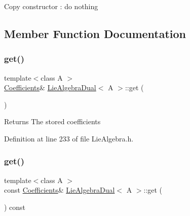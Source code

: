Copy constructor \+: do nothing 

\subsection{Member Function Documentation}
\hypertarget{class_lie_algebra_dual_a9e03668378642cf1147226aa6925a76d}{}\label{class_lie_algebra_dual_a9e03668378642cf1147226aa6925a76d} 
\subsubsection{\texorpdfstring{get()}{get()}\hspace{0.1cm}{\footnotesize\ttfamily [1/2]}}
{\footnotesize\ttfamily template$<$class A $>$ \\
\hyperlink{class_lie_algebra_dual_a82710c51eb4d0b6cbd190e76a33fbc17}{Coefficients}\& \hyperlink{class_lie_algebra_dual}{Lie\+Algebra\+Dual}$<$ A $>$\+::get (\begin{DoxyParamCaption}{ }\end{DoxyParamCaption})\hspace{0.3cm}{\ttfamily [inline]}}

\begin{DoxyReturn}{Returns}
The stored coefficients 
\end{DoxyReturn}


Definition at line 233 of file Lie\+Algebra.\+h.

\hypertarget{class_lie_algebra_dual_aa0fb0278ce57f0ec91b71b849d8e1f3c}{}\label{class_lie_algebra_dual_aa0fb0278ce57f0ec91b71b849d8e1f3c} 
\subsubsection{\texorpdfstring{get()}{get()}\hspace{0.1cm}{\footnotesize\ttfamily [2/2]}}
{\footnotesize\ttfamily template$<$class A $>$ \\
const \hyperlink{class_lie_algebra_dual_a82710c51eb4d0b6cbd190e76a33fbc17}{Coefficients}\& \hyperlink{class_lie_algebra_dual}{Lie\+Algebra\+Dual}$<$ A $>$\+::get (\begin{DoxyParamCaption}{ }\end{DoxyParamCaption}) const\hspace{0.3cm}{\ttfamily [inline]}}

